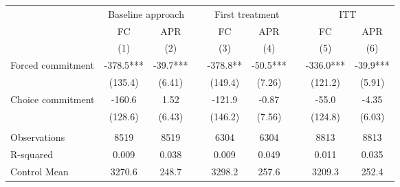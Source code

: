 \begin{tabular}{lcccccccc}
\toprule
      & \multicolumn{2}{c}{Baseline approach} &       & \multicolumn{2}{c}{First treatment} &       & \multicolumn{2}{c}{ITT} \\
\cmidrule{2-3}\cmidrule{5-6}\cmidrule{8-9}      & FC    & APR   &       & FC    & APR   &       & FC    & APR \\
\midrule
      & (1)   & (2)   &       & (3)   & (4)   &       & (5)   & (6) \\
\midrule
\midrule
Forced commitment & -378.5*** & -39.7*** &       & -378.8** & -50.5*** &       & -336.0*** & -39.9*** \\
      & (135.4) & (6.41) &       & (149.4) & (7.26) &       & (121.2) & (5.91) \\
Choice commitment & -160.6 & 1.52  &       & -121.9 & -0.87 &       & -55.0 & -4.35 \\
      & (128.6) & (6.43) &       & (146.2) & (7.56) &       & (124.8) & (6.03) \\
      &       &       &       &       &       &       &       &  \\
\midrule
Observations & 8519  & 8519  &       & 6304  & 6304  &       & 8813  & 8813 \\
R-squared & 0.009 & 0.038 &       & 0.009 & 0.049 &       & 0.011 & 0.035 \\
Control Mean & 3270.6 & 248.7 &       & 3298.2 & 257.6 &       & 3209.3 & 252.4 \\
\bottomrule
\bottomrule
\end{tabular}%
